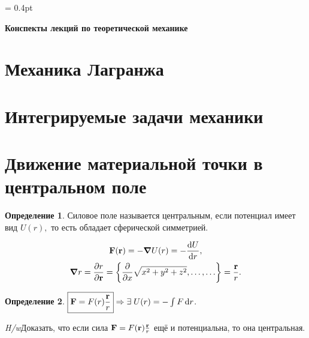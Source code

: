 \documentclass[12pt, a4paper]{article}
\begin{document}
\renewcommand{\cftsecaftersnum}{.}
\renewcommand{\cftsubsecaftersnum}{.}

\renewcommand\refname{Список литературы}

\theoremstyle{plain}
\newtheorem{thm}{Теорема}[section]
\newtheorem{lem}[thm]{Лемма}
\newtheorem{pst}{Постулат}[section]

\theoremstyle{definition}
\newtheorem{dfn}{Определение}[section]
\newtheorem{cns}[thm]{Следствие}
\newtheorem{proposition}{Предложение}[section]

\theoremstyle{remark}
\newtheorem{task}{Задача}[section]
\newtheorem{ex}{Пример}[subsection]
\newtheorem{cex}[ex]{Контрпример}
\newtheorem{rmk}{Замечание}[subsection]

\newcommand*{\eqdef}{\stackrel{\mathrm{def}}{=}}
\newcommand*{\is}[1]{\stackrel{\mathrm{\eqref{#1}}}{=}}
\newcommand*{\eqq}[1]{\stackrel{\mathrm{#1}}{=}}
\newcommand*{\hlf}{\frac{1}{2}}
\newcommand*{\hw}{\textit{H/w}}

\columnseprule = 0.4pt


\begin{center}
\Large{\textbf{Конспекты лекций по теоретической механике}}
\end{center}
\tableofcontents
\newpage

\section{Механика Лагранжа}

\newpage



\section{Интегрируемые задачи механики}


\newpage
\section{Движение материальной точки в центральном поле}
\begin{dfn}
Силовое поле называется центральным, если  потенциал имеет вид $U(r),$ то есть обладает сферической симметрией.
\end{dfn}
\begin{gather}
\vb{F}(\vb{r}) = - \grad U(r) = - \dv{U}{r},\\
\grad r = \pdv{r}{\vb{r}} = \left \{ \pdv{x} \sqrt{x^2 + y^2 + z^2}, \ldots, \ldots \right \} = \frac{\vb{r}}{r}.
\end{gather}
\begin{dfn}
$\boxed{\vb{F} = F(r) \frac{\vb{r}}{r}} \Rightarrow \exists \; U(r) = - \int F \dd{r}$.
\end{dfn}
\hw  Доказать, что если сила $\vb{F} = F(\vb{r}) \frac{\vb{r}}{r}$ ещё и потенциальна, то она центральная.
 
\end{document}
